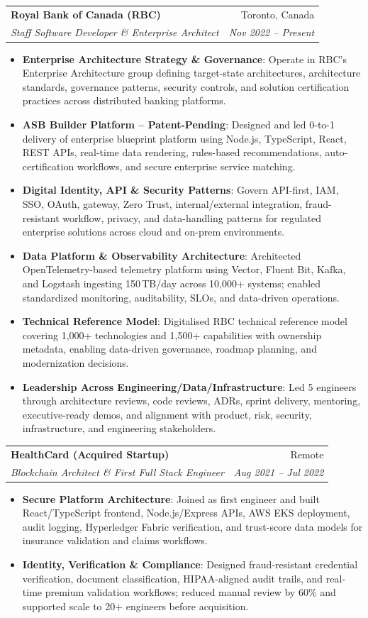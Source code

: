 \documentclass[letterpaper,9.5pt]{article}
\makeatletter
\newcommand{\resumeItem}[2]{\item\small{\textbf{#1}{: #2 \vspace{-2pt}}}}
\newcommand{\resumeSubheading}[4]{\vspace{-2pt}\item\begin{tabular*}{0.97\textwidth}{l@{\extracolsep{\fill}}r}\textbf{#1} & #2 \\\textit{\small#3} & \textit{\small #4} \\\end{tabular*}\vspace{-6pt}}
\newcommand{\resumeItemListStart}{\begin{itemize}}
\newcommand{\resumeItemListEnd}{\end{itemize}\vspace{-6pt}}
\makeatother
\begin{document}
  \resumeSubheading
    {Royal Bank of Canada (RBC)}{Toronto, Canada}
    {Staff Software Developer \& Enterprise Architect}{Nov 2022 -- Present}
  \resumeItemListStart
    \resumeItem{Enterprise Architecture Strategy \& Governance}
      {Operate in RBC's Enterprise Architecture group defining target-state architectures, architecture standards, governance patterns, security controls, and solution certification practices across distributed banking platforms.}
    \resumeItem{ASB Builder Platform -- Patent-Pending}
      {Designed and led 0-to-1 delivery of enterprise blueprint platform using Node.js, TypeScript, React, REST APIs, real-time data rendering, rules-based recommendations, auto-certification workflows, and secure enterprise service matching.}
    \resumeItem{Digital Identity, API \& Security Patterns}
      {Govern API-first, IAM, SSO, OAuth, gateway, Zero Trust, internal/external integration, fraud-resistant workflow, privacy, and data-handling patterns for regulated enterprise solutions across cloud and on-prem environments.}
    \resumeItem{Data Platform \& Observability Architecture}
      {Architected OpenTelemetry-based telemetry platform using Vector, Fluent Bit, Kafka, and Logstash ingesting 150\,TB/day across 10,000+ systems; enabled standardized monitoring, auditability, SLOs, and data-driven operations.}
    \resumeItem{Technical Reference Model}
      {Digitalised RBC technical reference model covering 1,000+ technologies and 1,500+ capabilities with ownership metadata, enabling data-driven governance, roadmap planning, and modernization decisions.}
    \resumeItem{Leadership Across Engineering/Data/Infrastructure}
      {Led 5 engineers through architecture reviews, code reviews, ADRs, sprint delivery, mentoring, executive-ready demos, and alignment with product, risk, security, infrastructure, and engineering stakeholders.}
  \resumeItemListEnd

  \resumeSubheading
    {HealthCard (Acquired Startup)}{Remote}
    {Blockchain Architect \& First Full Stack Engineer}{Aug 2021 -- Jul 2022}
  \resumeItemListStart
    \resumeItem{Secure Platform Architecture}
      {Joined as first engineer and built React/TypeScript frontend, Node.js/Express APIs, AWS EKS deployment, audit logging, Hyperledger Fabric verification, and trust-score data models for insurance validation and claims workflows.}
    \resumeItem{Identity, Verification \& Compliance}
      {Designed fraud-resistant credential verification, document classification, HIPAA-aligned audit trails, and real-time premium validation workflows; reduced manual review by 60\% and supported scale to 20+ engineers before acquisition.}
  \resumeItemListEnd
\end{document}
